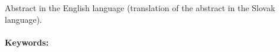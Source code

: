\documentclass[12pt, oneside]{book}  %
\begin{document}
Abstract in the English language (translation of the abstract in the
Slovak language).


\paragraph*{Keywords:}




\cleardoublepage
\tableofcontents



\newpage

\listoffigures
\listoftables


\mainmatter
\pagestyle{headings}










\newpage

\backmatter

\thispagestyle{empty}
\clearpage
{}








\end{document}
